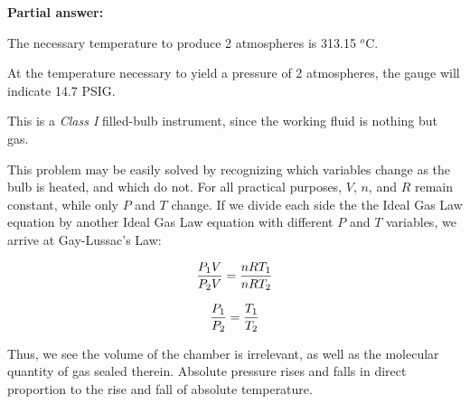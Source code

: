 
\noindent
{\bf Partial answer:}

\vskip 10pt

The necessary temperature to produce 2 atmospheres is 313.15 $^{o}$C.







At the temperature necessary to yield a pressure of 2 atmospheres, the gauge will indicate 14.7 PSIG.

\vskip 10pt

This is a {\it Class I} filled-bulb instrument, since the working fluid is nothing but gas.

\vskip 10pt

This problem may be easily solved by recognizing which variables change as the bulb is heated, and which do not.  For all practical purposes, $V$, $n$, and $R$ remain constant, while only $P$ and $T$ change.  If we divide each side the the Ideal Gas Law equation by another Ideal Gas Law equation with different $P$ and $T$ variables, we arrive at Gay-Lussac's Law:

$${P_1V \over P_2V} = {nRT_1 \over nRT_2}$$

$${P_1 \over P_2} = {T_1 \over T_2}$$

Thus, we see the volume of the chamber is irrelevant, as well as the molecular quantity of gas sealed therein.  Absolute pressure rises and falls in direct proportion to the rise and fall of absolute temperature.




